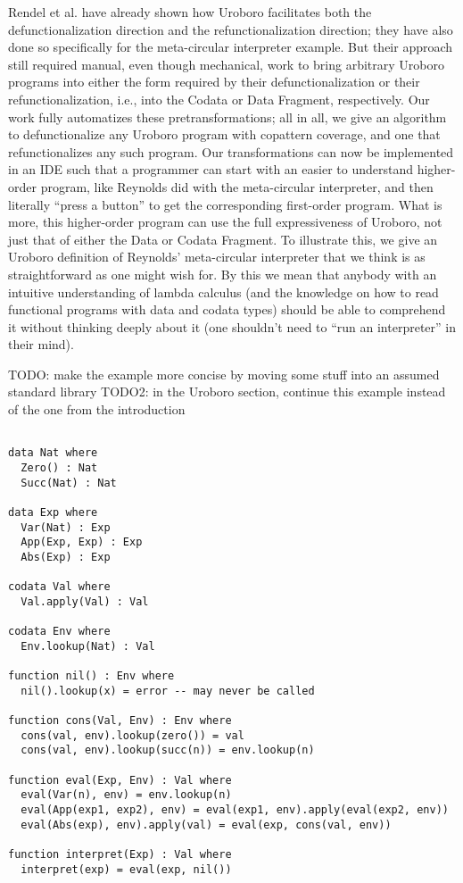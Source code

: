 Rendel et al.\cite{rendel15automatic} have already shown how Uroboro facilitates both the defunctionalization direction and the refunctionalization direction; they have also done so specifically for the meta-circular interpreter example. But their approach still required manual, even though mechanical, work to bring arbitrary Uroboro programs into either the form required by their defunctionalization or their refunctionalization, i.e., into the Codata or Data Fragment, respectively. Our work fully automatizes these pretransformations; all in all, we give an algorithm to defunctionalize any Uroboro program with copattern coverage, and one that refunctionalizes any such program. Our transformations can now be implemented in an IDE such that a programmer can start with an easier to understand higher-order program, like Reynolds\cite{reynolds72definitional} did with the meta-circular interpreter, and then literally ``press a button'' to get the corresponding first-order program. What is more, this higher-order program can use the full expressiveness of Uroboro, not just that of either the Data or Codata Fragment. To illustrate this, we give an Uroboro definition of Reynolds' meta-circular interpreter that we think is as straightforward as one might wish for. By this we mean that anybody with an intuitive understanding of lambda calculus (and the knowledge on how to read functional programs with data and codata types) should be able to comprehend it without thinking deeply about it (one shouldn't need to ``run an interpreter'' in their mind).

TODO: make the example more concise by moving some stuff into an assumed standard library
TODO2: in the Uroboro section, continue this example instead of the one from the introduction

\begin{lstlisting}

data Nat where
  Zero() : Nat
  Succ(Nat) : Nat

data Exp where
  Var(Nat) : Exp
  App(Exp, Exp) : Exp
  Abs(Exp) : Exp

codata Val where
  Val.apply(Val) : Val

codata Env where
  Env.lookup(Nat) : Val

function nil() : Env where
  nil().lookup(x) = error -- may never be called

function cons(Val, Env) : Env where
  cons(val, env).lookup(zero()) = val
  cons(val, env).lookup(succ(n)) = env.lookup(n)

function eval(Exp, Env) : Val where
  eval(Var(n), env) = env.lookup(n)
  eval(App(exp1, exp2), env) = eval(exp1, env).apply(eval(exp2, env))
  eval(Abs(exp), env).apply(val) = eval(exp, cons(val, env))

function interpret(Exp) : Val where
  interpret(exp) = eval(exp, nil())

\end{lstlisting}

